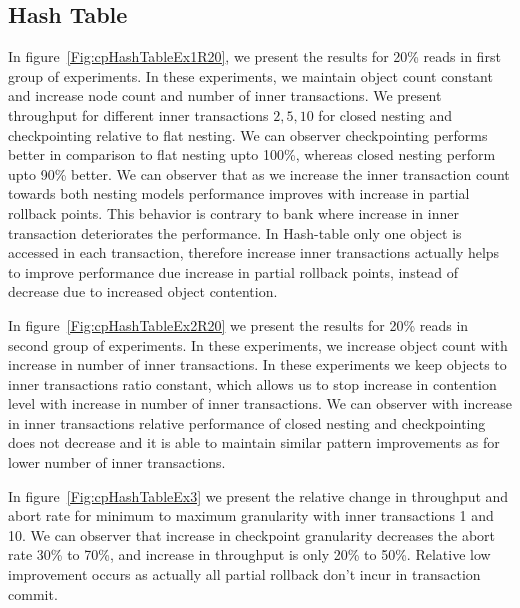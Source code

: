 \documentclass[12pt,english]{report}
\begin{document}
\subsection{Hash Table}

In figure~\ref{Fig:cpHashTableEx1R20}, we present the results for 20\% reads in first group of experiments. In these experiments, we maintain object count constant and increase node count and number of inner transactions. We present throughput for different inner transactions ${2, 5, 10}$ for closed nesting and checkpointing relative to flat nesting. We can observer checkpointing performs better in comparison to flat nesting upto 100\%, whereas closed nesting perform upto 90\% better. We can observer that as we increase the inner transaction count towards both nesting models performance improves with increase in partial rollback points. This behavior is contrary to bank where increase in inner transaction deteriorates the performance. In Hash-table only one object is accessed in each transaction, therefore increase inner transactions actually helps to improve performance due increase in partial rollback points, instead of decrease due to increased object contention.

In figure~\ref{Fig:cpHashTableEx2R20} we present the results for 20\% reads in second group of experiments. In these experiments, we increase object count with increase in number of inner transactions. In these experiments we keep objects to inner transactions ratio constant, which allows us to stop increase in contention level with increase in number of inner transactions. We can observer with increase in inner transactions relative performance of closed nesting and checkpointing does not decrease and it is able to maintain similar pattern improvements as for lower number of inner transactions.

In figure~\ref{Fig:cpHashTableEx3} we present the relative change in throughput and abort rate for minimum to maximum granularity with inner transactions 1 and 10. We can observer that increase in checkpoint granularity decreases the abort rate 30\% to 70\%, and increase in throughput is only 20\% to 50\%. Relative low improvement occurs as actually all partial rollback don't incur in transaction commit.
\end{document}
